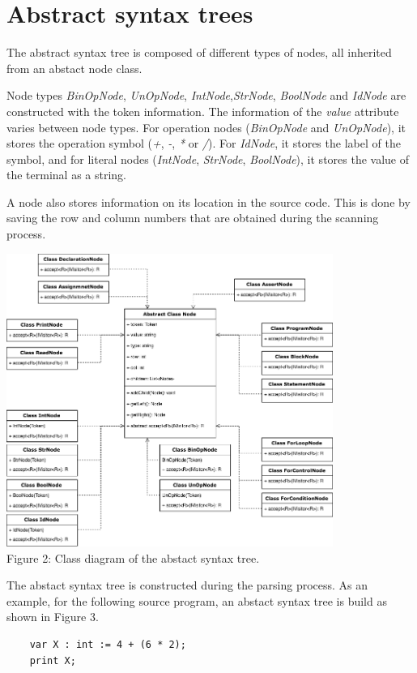 \documentclass[fleqn]{article}
\begin{document}
\newpage
\section{Abstract syntax trees}
The abstract syntax tree is composed of different types of nodes, all inherited from an abstact node class.
\par
Node types \textit{BinOpNode}, \textit{UnOpNode}, \textit{IntNode},\textit{StrNode}, \textit{BoolNode} and \textit{IdNode}
are constructed with the token information. The information of the \textit{value} attribute varies between node types.
For operation nodes (\textit{BinOpNode} and \textit{UnOpNode}), it stores the operation symbol (\textit{+}, \textit{-}, \textit{*} or \textit{/}).
For \textit{IdNode}, it stores the label of the symbol, and for literal nodes (\textit{IntNode}, \textit{StrNode}, \textit{BoolNode}),
it stores the value of the terminal as a string.
\par
A node also stores information on its location in the source code. This is done by saving the row and column numbers that are obtained during the scanning process.

{\centering
    \vspace*{1cm} 
    \includegraphics[width=0.8\textwidth]{ast}
    \\Figure 2: Class diagram of the abstact syntax tree.\par
}

\newpage
The abstact syntax tree is constructed during the parsing process. As an example, for the following source program, an abstact syntax tree is build as shown in Figure 3.

\begin{lstlisting}
    var X : int := 4 + (6 * 2);
    print X;
\end{lstlisting} 
 
\end{document}
